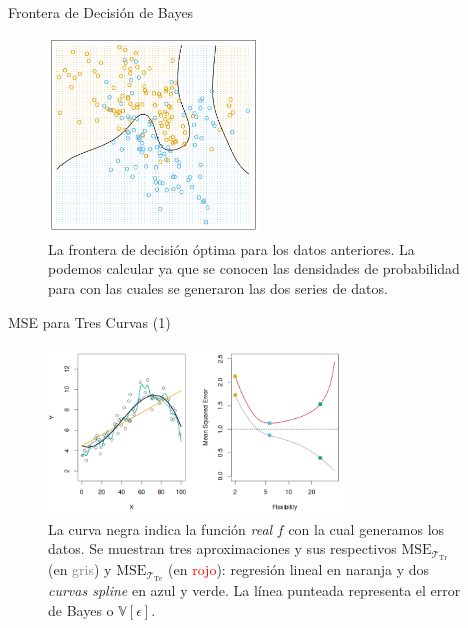 \documentclass[usenames,dvipsnames]{beamer} %
\begin{document}
\begin{frame}{Frontera de Decisi\'on de Bayes}
\begin{figure}\label{fig:1_fronterabayes}
	\centering
	\includegraphics[width=0.5\textwidth]{images/esl/fig_2_5.PNG}
	\caption{La frontera de decisi\'on \'optima para los datos anteriores. La podemos calcular ya que se conocen las densidades de probabilidad para con las cuales se generaron las dos series de datos.}
\end{figure}

\end{frame}

\begin{frame}{MSE para Tres Curvas (1)}
\begin{figure}
	\centering
	\includegraphics[width=0.7\textwidth]{images/islr/fig_2_9.png}
	\caption{La curva negra indica la funci\'on \textit{real} $f$ con la cual generamos los datos. Se muestran tres aproximaciones y sus respectivos $\text{MSE}_{\mathcal{T}_{\text{Tr}}}$ (en \textcolor{gray}{gris}) y $\text{MSE}_{\mathcal{T}_{\text{Te}}}$ (en \textcolor{red}{rojo}): regresi\'on lineal en naranja y dos \textit{curvas spline} en azul y verde. La l\'inea punteada representa el error de Bayes o $\mathbb{V}[\epsilon]$.}
	\label{fig:1_3curvas_1}
\end{figure}
\end{frame}
\end{document}
